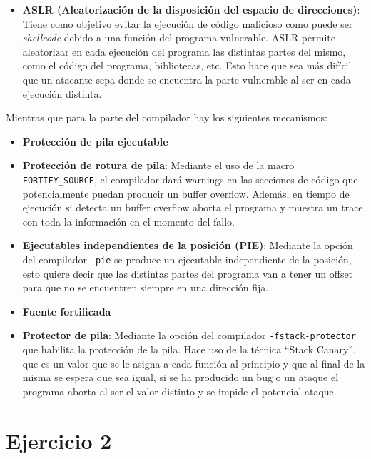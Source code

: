 \documentclass{article}
\begin{document}
\begin{itemize}
    \item \textbf{ASLR (Aleatorización de la disposición del espacio de direcciones)}: Tiene como objetivo evitar la ejecución de código malicioso como puede ser \textit{shellcode} debido a una función del programa vulnerable. ASLR permite aleatorizar en cada ejecución del programa las distintas partes del mismo, como el código del programa, bibliotecas, etc. Esto hace que sea más difícil que un atacante sepa donde se encuentra la parte vulnerable al ser en cada ejecución distinta.
\end{itemize}

\bigskip

Mientras que para la parte del compilador hay los siguientes mecanismos:

\begin{itemize}
    \item \textbf{Protección de pila ejecutable}
    \item \textbf{Protección de rotura de pila}: Mediante el uso de la macro \verb|FORTIFY_SOURCE|, el compilador dará warnings en las secciones de código que potencialmente puedan producir un buffer overflow. Además, en tiempo de ejecución si detecta un buffer overflow aborta el programa y muestra un trace con toda la información en el momento del fallo.
    \item \textbf{Ejecutables independientes de la posición (PIE)}: Mediante la opción del compilador \verb|-pie| se produce un ejecutable independiente de la posición, esto quiere decir que las distintas partes del programa van a tener un offset para que no se encuentren siempre en una dirección fija.
    \item \textbf{Fuente fortificada}
    \item \textbf{Protector de pila}: Mediante la opción del compilador \verb|-fstack-protector| que habilita la protección de la pila. Hace uso de la técnica ``Stack Canary'', que es un valor que se le asigna a cada función al principio y que al final de la misma se espera que sea igual, si se ha producido un bug o un ataque el programa aborta al ser el valor distinto y se impide el potencial ataque.
\end{itemize}

\newpage

{}
\section*{Ejercicio 2}
\end{document}
